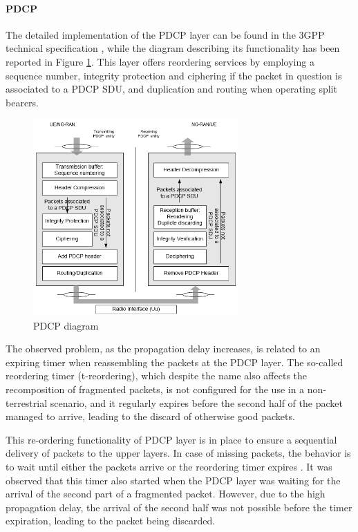 \paragraph{PDCP}
The detailed implementation of the \ac{PDCP} layer can be found in the \ac{3GPP} technical specification \cite{pdcp-spec-3gpp}, while the diagram describing its functionality has been reported in Figure \ref{fig:pdcp-functionalities}. This layer offers reordering services by employing a sequence number, integrity protection and ciphering if the packet in question is associated to a \ac{PDCP} \ac{SDU}, and duplication and routing when operating split bearers.

\begin{figure}[ht]
    \centering
    \includegraphics[width=0.7\textwidth]{res/pdcp-functionality.png}
    \caption{PDCP diagram \cite{pdcp-spec-3gpp}}
    \label{fig:pdcp-functionalities}
\end{figure}

The observed problem, as the propagation delay increases, is related to an expiring timer when reassembling the packets at the \ac{PDCP} layer. The so-called reordering timer (t-reordering), which despite the name also affects the recomposition of fragmented packets, is not configured for the use in a non-terrestrial scenario, and it regularly expires before the second half of the packet managed to arrive, leading to the discard of otherwise good packets.

This re-ordering functionality of \ac{PDCP} layer is in place to ensure a sequential delivery of packets to the upper layers. In case of missing packets, the behavior is to wait until either the packets arrive or the reordering timer expires \cite{efficient-reassembly-pdcp}. It was observed that this timer also started when the \ac{PDCP} layer was waiting for the arrival of the second part of a fragmented packet. However, due to the high propagation delay, the arrival of the second half was not possible before the timer expiration, leading to the packet being discarded.


